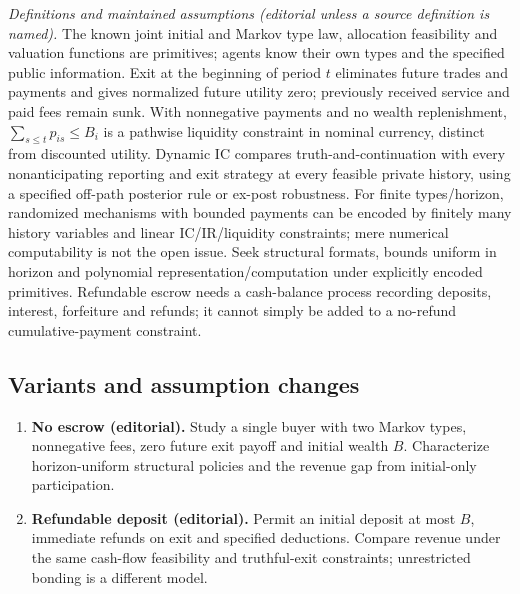 \documentclass[11pt,a4paper]{article}
\begin{document}
\emph{Definitions and maintained assumptions (editorial unless a source definition is named).} The known joint initial and Markov type law, allocation feasibility and valuation functions are primitives; agents know their own types and the specified public information. Exit at the beginning of period \(t\) eliminates future trades and payments and gives normalized future utility zero; previously received service and paid fees remain sunk. With nonnegative payments and no wealth replenishment, \(\sum_{s\le t}p_{is}\le B_i\) is a pathwise liquidity constraint in nominal currency, distinct from discounted utility. Dynamic IC compares truth-and-continuation with every nonanticipating reporting and exit strategy at every feasible private history, using a specified off-path posterior rule or ex-post robustness. For finite types/horizon, randomized mechanisms with bounded payments can be encoded by finitely many history variables and linear IC/IR/liquidity constraints; mere numerical computability is not the open issue. Seek structural formats, bounds uniform in horizon and polynomial representation/computation under explicitly encoded primitives. Refundable escrow needs a cash-balance process recording deposits, interest, forfeiture and refunds; it cannot simply be added to a no-refund cumulative-payment constraint.
\subsection*{Variants and assumption changes}
\begin{enumerate}
\item \textbf{No escrow (editorial).} Study a single buyer with two Markov types, nonnegative fees, zero future exit payoff and initial wealth \(B\). Characterize horizon-uniform structural policies and the revenue gap from initial-only participation.
\item \textbf{Refundable deposit (editorial).} Permit an initial deposit at most \(B\), immediate refunds on exit and specified deductions. Compare revenue under the same cash-flow feasibility and truthful-exit constraints; unrestricted bonding is a different model.
\end{enumerate}
\end{document}
